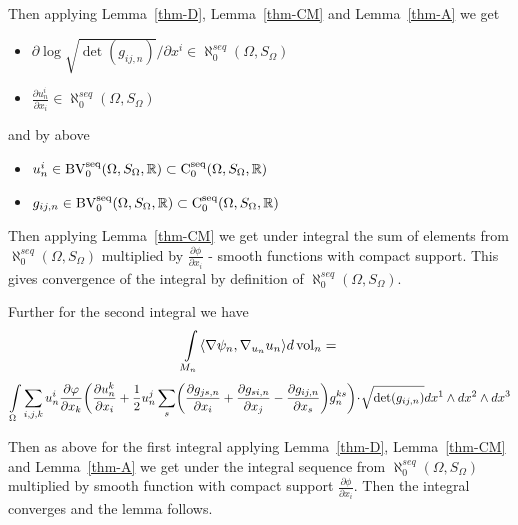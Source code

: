 \documentclass[a4paper,10pt]{article}
\begin{document}
Then applying
Lemma~\ref{thm-D}, Lemma~\ref{thm-CM} and
Lemma~\ref{thm-A} we get

\begin{itemize}

\item $\partial \log \sqrt {\det (g_{ij,n})}/\partial x^i\in \aleph_0^{seq}(\Omega,S_\Omega)$

 \item $\frac{\partial u_n^i}{\partial x_i}\in \aleph_0^{seq}(\Omega,S_\Omega)$
 
 \end{itemize} 
 
 and by above
 
  \begin{itemize}
  
  \item ${u^i_n}\in  \operatorname{BV_0^{seq}}(\Omega,S_\Omega,\mathbb{R})\subset\operatorname{C_0^{seq}}(\Omega,S_\Omega,\mathbb{R})$ 
 
 \item $g_{i j,n}\in   \operatorname{BV_0^{seq}}(\Omega,S_\Omega,\mathbb{R})\subset \operatorname{C_0^{seq}}(\Omega,S_\Omega,\mathbb{R})$
 
  \end{itemize}
  
  Then applying Lemma~\ref{thm-CM}
  we get under integral the sum of elements from $\aleph_0^{seq}(\Omega,S_\Omega)$
  multiplied by $\frac{\partial \phi}{\partial x_i}$ - smooth functions with compact support.
       This gives convergence of the integral by definition of  $\aleph_0^{seq}(\Omega,S_\Omega)$.
              

Further for the second integral %
we have
$$\int\limits_{M_n}\langle\nabla\psi_n,\nabla_{u_n} u_n\rangle d\operatorname{vol}_n=$$
 $$\int\limits_{\Omega}  \sum_{i,j,k}u^i_n \frac{\partial \phi}{\partial x_k}
 \biggl(\frac{\partial u^k_n}{\partial x_i} +\frac{1}{2}u^j_n\sum_s
 \biggl(\frac{\partial g_{ js,n}}{\partial x_i}+\frac{\partial g_{si,n}}{\partial x_j}-\frac{\partial g_{i j,n}}{\partial x_s}\biggr) g^{ks}_n\biggr)\cdot \sqrt{\op{det}(g_{i j,n})}dx^1\wedge dx^2\wedge dx^3$$ 
 
 Then as above for the first integral
 applying
Lemma~\ref{thm-D}, Lemma~\ref{thm-CM} and
Lemma~\ref{thm-A}  
 we  get under the integral sequence from $\aleph_0^{seq}(\Omega,S_\Omega)$
  multiplied by smooth function with compact support $\frac{\partial \phi}{\partial x_i}$. Then the integral converges and the lemma follows.
  
  \qeds


\end{document}
